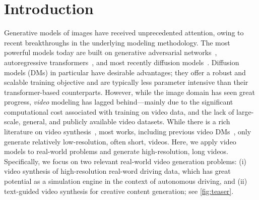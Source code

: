 \vspace{-3mm}
\section{Introduction}\label{sec:intro}
\vspace{-1mm}

 
Generative models of images have received unprecedented attention, owing to recent breakthroughs in the underlying modeling methodology. The most powerful models today are built on generative adversarial networks~\cite{goodfellow2014generative,karras2019style,karras2020analyzing,karras2021aliasfree,sauer2021styleganxl}, autoregressive transformers~\cite{esser2020taming,ramesh2021dalle,yu2022parti}, and most recently diffusion models~\cite{sohl2015deep,ho2020ddpm,song2020score,nichol2021improved,dhariwal2021diffusion,ho2021cascaded,nichol2021glide,rombach2021highresolution,ramesh2022dalle2,saharia2022imagen}.
Diffusion models (DMs) in particular have desirable advantages; they offer a robust and scalable training objective and are typically less parameter intensive than their transformer-based counterparts. 
However, while the image domain has seen great progress, \emph{video} modeling has lagged behind---mainly due to the significant computational cost associated with training on video data, and the lack of large-scale, general, and publicly available video datasets. While there is a rich literature on video synthesis~\cite{babaeizadeh2018stochastic,svg,lee2018savp,hvrnn,lsvg,Weissenborn2020Scaling,yan2021videogpt,hong2022cogvideo,wu2021godiva,wu2022nuwa,ge2022longvideo,Gupta_2022_CVPR,scene_dyn,yu2022generating,tian2021a, villegas17mcnet,Luc2020TransformationbasedAV,TGAN2020,brooks2022generating,Skorokhodov_2022_CVPR,kahembwe2020lower,hong2022cogvideo,mittal2017sync,Pan2017ToCW,marwah2017attentive,li2017video,gupta2018imagine}, most works, including previous video DMs~\cite{yang2022video,ho2022video,hoeppe2022diffusion,voleti2022mcvd,harvey2022flexible}, only generate relatively low-resolution, often short, videos.
Here, we apply video models to real-world problems and generate high-resolution, long videos. 
Specifically, we focus on two relevant real-world video generation problems: (i) video synthesis of high-resolution real-word driving data, which has great potential as a simulation engine in the context of autonomous driving, and (ii) text-guided video synthesis for creative content generation; see \cref{fig:teaser}.

